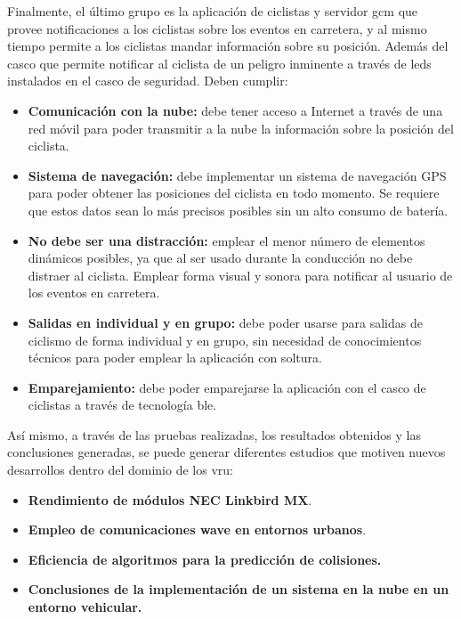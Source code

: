 Finalmente, el último grupo es la aplicación de ciclistas y servidor \gls{gcm} que provee
notificaciones a los ciclistas sobre los eventos en carretera, y al mismo tiempo permite a
los ciclistas mandar información sobre su posición. Además del casco  que 
permite notificar al ciclista de un peligro inminente a través de leds instalados en el casco
de seguridad. Deben cumplir:
\begin{itemize}
	\item \textbf{Comunicación con la nube:} debe tener acceso a Internet a través de una red
	móvil para poder transmitir a la nube la información sobre la posición del ciclista.
	
	\item \textbf{Sistema de navegación:} debe implementar un sistema de navegación GPS para
	poder obtener las posiciones del ciclista en todo momento. Se requiere que estos datos sean
	lo más precisos posibles sin un alto consumo de batería.
	
	\item \textbf{No debe ser una distracción:} emplear el menor número de elementos dinámicos
	posibles, ya que al ser usado durante la conducción no debe distraer al ciclista. Emplear
	forma visual y sonora para notificar al usuario de los eventos en carretera.
	
	\item \textbf{Salidas en individual y en grupo:} debe poder usarse para salidas de ciclismo
	de forma individual y en grupo, sin necesidad de conocimientos técnicos para poder emplear
	la aplicación con soltura.
	
	\item \textbf{Emparejamiento:} debe poder emparejarse la aplicación con el casco de ciclistas
	a través de tecnología \gls{ble}.
\end{itemize}

Así mismo, a través de las pruebas realizadas, los resultados obtenidos y las conclusiones
generadas, se puede generar diferentes estudios que motiven nuevos desarrollos dentro del
dominio de los \gls{vru}:
\begin{itemize}
	\item \textbf{Rendimiento de módulos NEC Linkbird MX}.
	
	\item \textbf{Empleo de comunicaciones \gls{wave} en entornos urbanos}.
	
	\item \textbf{Eficiencia de algoritmos para la predicción de colisiones.}
	
	\item \textbf{Conclusiones de la implementación de un sistema en la nube
		en un entorno vehicular.}
\end{itemize}
